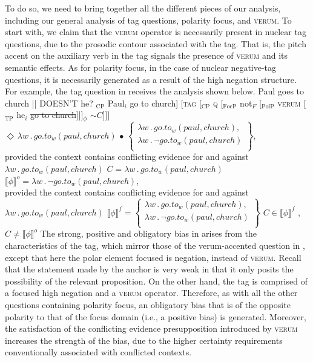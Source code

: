 \documentclass[output=paper,colorlinks,citecolor=brown]{langscibook}
\begin{document}
To do so, we need to bring together all the different pieces of our analysis, including our general analysis of tag questions, polarity focus, and \textsc{verum}. To start with, we claim that the \textsc{verum} operator is necessarily present in nuclear tag questions, due to the prosodic contour associated with the tag. That is, the pitch accent on the auxiliary verb in the tag signals the presence of \textsc{verum} and its semantic effects. As for polarity focus, in the case of nuclear negative-tag questions, it is necessarily generated as a result of the high negation structure. For example, the  tag question in  receives the analysis shown below.  
\is{}
\ea Paul goes to church || DOESN'T he?\label{nNTQ.Anyls}
    \ea {[[}$_{\text{CP}}$ Paul$_i$ go to church] [\textsc{tag} {[}$_{\text{CP}}$ \textsc{q} [$_{\text{FocP}}$ not$_{F}$ [$_{\text{PolP}}$ \textsc{verum} [$_{\text{TP}}$ he$_i$ \sout{go to church}]]]$_{\phi}$ $\sim C$]]]\label{nNTQ.LF}
    \ex $\Diamond \, \lambda w \, . \, go.to_w(paul,church) \, \bullet \, 
            \left\{ \begin{array}{l}
            \lambda w \, . \, go.to_w(paul,church), \\ 
            \lambda w \, . \,\neg go.to_w(paul,church) \\ 
            \end{array} \right\}$, \\
            provided the context contains conflicting evidence for and against $\lambda w \, . \, go.to_w(paul,church)$
    \ex  $C = \lambda w \, . \, go.to_w(paul,church)$\label{NegNTQ.C}
    \ex $\llbracket \phi \rrbracket^{o} = \lambda w \, . \,\neg go.to_w(paul,church)$\label{nNTQ.phi}, \\
        provided the context contains conflicting evidence for and against $\lambda w \, . \, go.to_w(paul,church)$
    \ex $\llbracket \phi \rrbracket^{f} = \left\{ \begin{array}{l}
            \lambda w \, . \, go.to_w(paul,church), \\ 
            \lambda w \, . \,\neg go.to_w(paul,church) \\ 
            \end{array} \right\}  $
    \ex $C \in  \llbracket \phi \rrbracket ^f$ \cmark, \, $C \ne \llbracket \phi  \rrbracket ^o$ \cmark
    \z
\z
\il{}
The strong, positive and obligatory bias in  arises from the characteristics of the tag, which mirror those of the verum-accented question in , except that here the polar element focused is negation, instead of \textsc{verum}. Recall that the statement made by the anchor is very weak in that it only posits the possibility of the relevant proposition. On the other hand, the tag is comprised of a focused  high negation and a \textsc{verum} operator. Therefore, as with all the other questions containing polarity focus, an obligatory bias that is of the opposite polarity to that of the focus domain (i.e., a positive bias) is generated. Moreover, the satisfaction of the conflicting evidence presupposition introduced by \textsc{verum} increases the strength of the bias, due to the higher certainty requirements conventionally associated with conflicted contexts.
\end{document}
